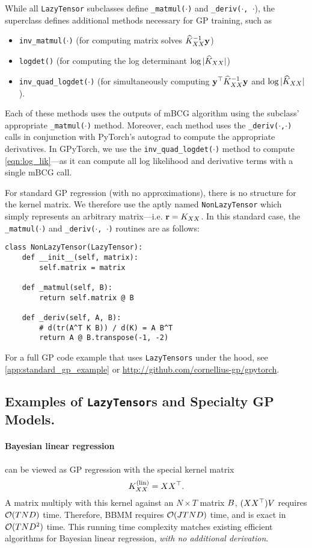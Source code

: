 While all {\tt LazyTensor} subclasses define {\tt \_matmul($\cdot$)} and {\tt \_deriv($\cdot$, $\cdot$}),
the superclass defines additional methods necessary for GP training, such as
%
\begin{itemize}
  \item {\tt inv\_matmul($\cdot$)} (for computing matrix solves $\widehat{K}_{XX}^{-1} \mathbf{y}$)
  \item {\tt logdet()} (for computing the log determinant $\log \vert \widehat{K}_{XX} \vert$)
  \item {\tt inv\_quad\_logdet($\cdot$)} (for simultaneously computing $\mathbf{y}^\top \widehat{K}_{XX}^{-1} \mathbf{y}$ and $\log \vert \widehat{K}_{XX} \vert$).
\end{itemize}
%
Each of these methods uses the outputs of mBCG algorithm using the subclass' appropriate {\tt \_matmul($\cdot$)} method.
Moreover, each method uses the {\tt \_deriv($\cdot$,$\cdot$)} calls in conjunction with PyTorch's autograd \cite{paszke2017automatic} to compute the appropriate derivatives.
In GPyTorch, we use the {\tt inv\_quad\_logdet($\cdot$)} method to compute \cref{eqn:log_lik}---as it can compute all log likelihood and derivative terms with a single mBCG call.

For standard GP regression (with no approximations), there is no structure for the kernel matrix.
We therefore use the aptly named {\tt NonLazyTensor} which simply represents an arbitrary matrix---i.e. $\mathbf{r} = K_{XX}$.
In this standard case, the {\tt \_matmul($\cdot$)} and {\tt \_deriv($\cdot$, $\cdot$)} routines are as follows:
%
\begin{verbatim}
class NonLazyTensor(LazyTensor):
    def __init__(self, matrix):
        self.matrix = matrix

    def _matmul(self, B):
        return self.matrix @ B

    def _deriv(self, A, B):
        # d(tr(A^T K B)) / d(K) = A B^T
        return A @ B.transpose(-1, -2)
\end{verbatim}
%
\noindent
For a full GP code example that uses {\tt LazyTensors} under the hood, see \cref{app:standard_gp_example} or \url{http://github.com/cornellius-gp/gpytorch}.


\subsection{Examples of {\tt LazyTensor}s and Specialty GP Models.}
\paragraph{Bayesian linear regression} can be viewed as GP regression with the special kernel matrix
\[
  K_{XX}^{(\text{lin})} = XX^{\top}.
\]
A matrix multiply with this kernel against an $N \times T$ matrix $B$, $(XX^{\top})V$ requires $\bigo{TND}$ time.
Therefore, BBMM requires $\bigo{JTND}$ time, and is exact in $\bigo{TND^2}$ time.
This running time complexity matches existing efficient algorithms for Bayesian linear regression, \emph{with no additional derivation}.

